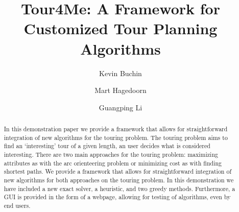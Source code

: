 \documentclass[sigconf,natbib=false]{acmart}
\begin{document}
\title{Tour4Me: A Framework for Customized Tour Planning Algorithms}


\author{Kevin Buchin}

\author{Mart Hagedoorn}

\author{Guangping Li}

\renewcommand{\shortauthors}{Buchin, Hagedoorn, and Li}
\newcommand{\tG}{\textsc{tourGenerator}}

\begin{abstract}
In this demonstration paper we provide a framework that allows for straightforward integration of new algorithms for the touring problem. 
The touring problem aims to find an `interesting' tour of a given length, an user decides what is considered interesting.
There are two main approaches for the touring problem: maximizing attributes as with the arc orienteering problem or minimizing cost as with finding shortest paths.
We provide a framework that allows for straightforward integration of new algorithms for both approaches on the touring problem. 
In this demonstration we have included a new exact solver, a heuristic, and two greedy methods.
Furthermore, a GUI is provided in the form of a webpage, allowing for testing of algorithms, even by end users.
\end{abstract}
\end{document}
